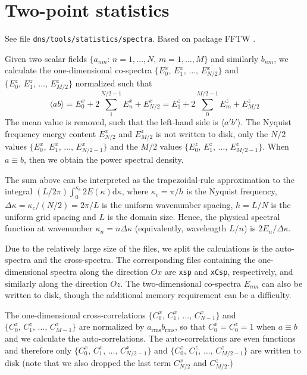 \section{Two-point statistics}
\sloppy

See file {\tt dns/tools/statistics/spectra}. Based on package FFTW \cite{Frigo:2005}.

Given two scalar fields $\{a_{nm}:\,n=1,\ldots,N,\,m=1,\ldots,M\}$ and similarly
$b_{nm}$, we calculate the one-dimensional co-spectra
$\{E^x_0,\,E^x_1,\,\ldots,\,E^x_{N/2}\}$ and
$\{E^z_0,\,E^z_1,\,\ldots,\,E^z_{M/2}\}$ normalized such that
\begin{equation}
\langle ab\rangle = E^x_0+2\sum_1^{N/2-1}E^x_n+E^x_{N/2} = E^z_1+2\sum_0^{M/2-1}E^z_m+E^z_{M/2}
\end{equation}
The mean value is removed, such that the left-hand side is $\langle
a'b'\rangle$. The Nyquist frequency energy content $E^x_{N/2}$ and $E^z_{M/2}$
is not written to disk, only the $N/2$ values
$\{E^x_0,\,E^x_1,\,\ldots,\,E^x_{N/2-1}\}$ and the $M/2$ values
$\{E^z_0,\,E^z_1,\,\ldots,\,E^z_{M/2-1}\}$. When $a\equiv b$, then we obtain the
power spectral density.

The sum above can be interpreted as the trapezoidal-rule approximation to the
integral $(L/2\pi)\int_0^{\kappa_c}2E(\kappa)\mathrm{d}\kappa$, where
$\kappa_c=\pi/h$ is the Nyquist frequency, $\Delta \kappa=\kappa_c/(N/2)=2\pi/L$
is the uniform wavenumber spacing, $h=L/N$ is the uniform grid spacing and $L$
is the domain size. Hence, the physical spectral function at wavenumber $\kappa_n=
n\Delta \kappa$ (equivalently, wavelength $L/n$) is $2E_n/\Delta \kappa$.

Due to the relatively large size of the files, we split the calculations is the
auto-spectra and the cross-spectra. The corresponding files containing the
one-dimensional spectra along the direction $Ox$ are {\tt xsp} and {\tt xCsp},
respectively, and similarly along the direction $Oz$. The two-dimensional
co-spectra $E_{nm}$ can also be written to disk, though the additional memory
requirement can be a difficulty.

The one-dimensional cross-correlations $\{C^x_0,\,C^x_1,\,\ldots,\,C^x_{N-1}\}$
and $\{C^z_0,\,C^z_1,\,\ldots,\,C^z_{M-1}\}$ are normalized by
$a_\mathrm{rms}b_\mathrm{rms}$, so that $C^x_0 = C^z_0 =1$ when $a\equiv b$ and
we calculate the auto-correlations. The auto-correlations are even functions and
therefore only $\{C^x_0,\,C^x_1,\,\ldots,\,C^x_{N/2-1}\}$ and
$\{C^z_0,\,C^z_1,\,\ldots,\,C^z_{M/2-1}\}$ are written to disk (note that we
also dropped the last term $C^x_{N/2}$ and $C^z_{M/2}$.)

